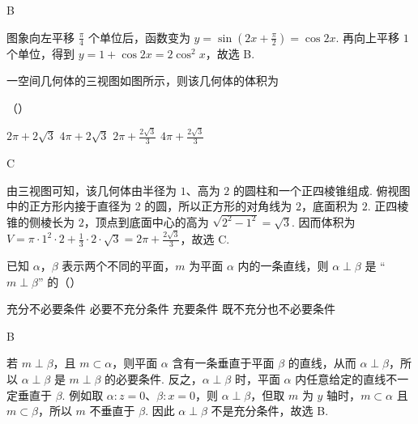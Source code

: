 \begin{answer}
B
\end{answer}

\begin{solution}
图象向左平移 \(\frac{\pi}{4}\) 个单位后，函数变为 \(y=\sin\left(2x+\frac{\pi}{2}\right)=\cos2x\). 再向上平移 \(1\) 个单位，得到 \(y=1+\cos2x=2\cos^2x\)，故选 B.
\end{solution}

\begin{problem}
一空间几何体的三视图如图所示，则该几何体的体积为


（\quad）

\choices
    {\(2\pi + 2\sqrt{3}\)}
    {\(4\pi + 2\sqrt{3}\)}
    {\(2\pi + \frac{2\sqrt{3}}{3}\)}
    {\(4\pi + \frac{2\sqrt{3}}{3}\)}
\end{problem}

\begin{answer}
C
\end{answer}

\begin{solution}
由三视图可知，该几何体由半径为 \(1\)、高为 \(2\) 的圆柱和一个正四棱锥组成. 俯视图中的正方形内接于直径为 \(2\) 的圆，所以正方形的对角线为 \(2\)，底面积为 \(2\). 正四棱锥的侧棱长为 \(2\)，顶点到底面中心的高为 \(\sqrt{2^2-1^2}=\sqrt3\). 因而体积为
\(\displaystyle V=\pi\cdot1^2\cdot2+\frac13\cdot2\cdot\sqrt3=2\pi+\frac{2\sqrt3}{3}\)，故选 C.
\end{solution}

\begin{problem}
已知 \(\alpha\)，\(\beta\) 表示两个不同的平面，\(m\) 为平面 \(\alpha\) 内的一条直线，则 \(\alpha \perp \beta\) 是 “\(m \perp \beta\)” 的（\quad）

\choices
    {充分不必要条件}
    {必要不充分条件}
    {充要条件}
    {既不充分也不必要条件}
\end{problem}

\begin{answer}
B
\end{answer}

\begin{solution}
若 \(m\perp\beta\)，且 \(m\subset\alpha\)，则平面 \(\alpha\) 含有一条垂直于平面 \(\beta\) 的直线，从而 \(\alpha\perp\beta\)，所以 \(\alpha\perp\beta\) 是 \(m\perp\beta\) 的必要条件. 反之，\(\alpha\perp\beta\) 时，平面 \(\alpha\) 内任意给定的直线不一定垂直于 \(\beta\). 例如取 \(\alpha:z=0\)、\(\beta:x=0\)，则 \(\alpha\perp\beta\)，但取 \(m\) 为 \(y\) 轴时，\(m\subset\alpha\) 且 \(m\subset\beta\)，所以 \(m\) 不垂直于 \(\beta\). 因此 \(\alpha\perp\beta\) 不是充分条件，故选 B.
\end{solution}

